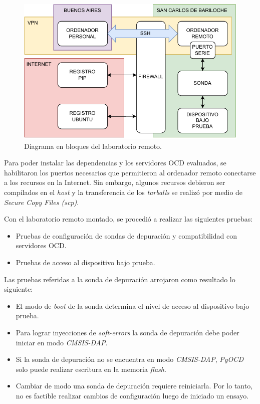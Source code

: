 \begin{figure}[htbp]
	\centering
	\includegraphics[width=\textwidth]{./Figures/vpn.pdf}
    \caption{Diagrama en bloques del laboratorio remoto.}
	\label{fig:remotelab}
\end{figure}

Para poder instalar las dependencias y los servidores OCD evaluados, se habilitaron los puertos necesarios que permitieron al ordenador remoto conectarse a los recursos en la Internet.
Sin embargo, algunos recursos debieron ser compilados en el \emph{host} y la transferencia de los \emph{tarballs} se realizó por medio de \emph{Secure Copy Files (scp)}.

Con el laboratorio remoto montado, se procedió a realizar las siguientes pruebas:
\begin{itemize}
    \item Pruebas de configuración de sondas de depuración y compatibilidad con servidores OCD.
    \item Pruebas de acceso al dispositivo bajo prueba.
\end{itemize}

Las pruebas referidas a la sonda de depuración arrojaron como resultado lo siguiente:

\begin{itemize}
    \item El modo de \emph{boot} de la sonda determina el nivel de acceso al dispositivo bajo prueba.
    \item Para lograr inyecciones de \emph{soft-errors} la sonda de depuración debe poder iniciar en modo \emph{CMSIS-DAP}.
    \item Si la sonda de depuración no se encuentra en modo \emph{CMSIS-DAP}, \emph{PyOCD} solo puede realizar escritura en la memoria \emph{flash}.
    \item Cambiar de modo una sonda de depuración requiere reiniciarla.
        Por lo tanto, no es factible realizar cambios de configuración luego de iniciado un ensayo.
\end{itemize}

